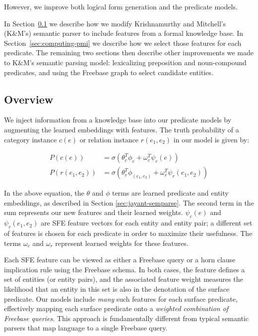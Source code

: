 \documentclass[11pt]{article}
\newcommand{\secref}[1]{Section~\ref{sec:#1}}
\begin{document}
However, we improve both
logical form generation and the predicate models.


In
\secref{formal-and-distributional} we describe how we modify
Krishnamurthy and Mitchell's (K\&M's) semantic parser to include
features from a formal knowledge base.  In \secref{computing-pmi} we
describe how we select those features for each predicate.  The
remaining two sections then describe other improvements we made to
K\&M's semantic parsing model: lexicalizing preposition and
noun-compound predicates, and using the Freebase graph to select
candidate entities.



\subsection{Overview}
\label{sec:formal-and-distributional}


We inject information from a knowledge base into our predicate models
by augmenting the learned embeddings with features. The truth
probability of a category instance $c(e)$ or relation instance $r(e_1,
e_2)$ in our model is given by:

\begin{align*}
  P(c(e)) &= \sigma ( \theta_c^T \phi_e + \omega_c^T \psi_c(e)) \\
  P(r(e_1, e_2)) &= \sigma ( \theta_r^T \phi_{(e_1, e_2)} + \omega_r^T \psi_r(e_1, e_2) )
\end{align*}

In the above equation, the $\theta$ and $\phi$ terms are learned
predicate and entity embeddings, as described in Section
\ref{sec:jayant-semparse}. The second term in the sum represents our
new features and their learned weights. $\psi_c(e)$ and $\psi_r(e_1,
e_2)$ are SFE feature vectors for each entity and entity pair; a
different set of features is chosen for each predicate in order to
maximize their usefulness. The terms $\omega_c$ and $\omega_r$
represent learned weights for these features.

Each SFE feature can be viewed as either a Freebase query or a horn
clause implication rule using the Freebase schema. In both cases, the
feature defines a set of entities (or entity pairs), and the
associated feature weight measures the likelihood that an entity in
this set is also in the denotation of the surface predicate. Our
models include \emph{many} such features for each surface predicate,
effectively mapping each surface predicate onto a \emph{weighted
  combination of Freebase queries}. This approach is fundamentally
different from typical semantic parsers that map language to a single
Freebase query.
\end{document}
